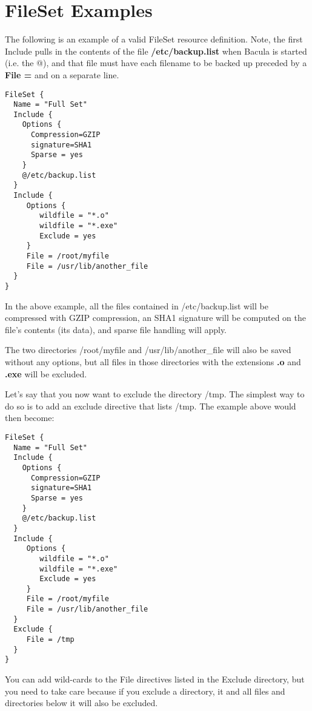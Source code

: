 \section{FileSet Examples}

The following is an example of a valid FileSet resource definition.  Note,
the first Include pulls in the contents of the file {\bf /etc/backup.list}
when Bacula is started (i.e.  the @), and that file must have each filename
to be backed up preceded by a {\bf File =} and on a separate line.

\footnotesize
\begin{verbatim}
FileSet {
  Name = "Full Set"
  Include {
    Options {
      Compression=GZIP
      signature=SHA1
      Sparse = yes
    }
    @/etc/backup.list
  }
  Include {
     Options {
        wildfile = "*.o"
        wildfile = "*.exe"
        Exclude = yes
     }
     File = /root/myfile
     File = /usr/lib/another_file
  }
}
\end{verbatim}
\normalsize

In the above example, all the files contained in /etc/backup.list will
be compressed with GZIP compression, an SHA1 signature will be computed on the
file's contents (its data), and sparse file handling will apply. 

The two directories /root/myfile and /usr/lib/another\_file will also be saved
without any options, but all files in those directories with the extensions
{\bf .o} and {\bf .exe} will be excluded. 

Let's say that you now want to exclude the directory /tmp. The simplest way
to do so is to add an exclude directive that lists /tmp.  The example
above would then become:

\footnotesize 
\begin{verbatim}
FileSet {
  Name = "Full Set"
  Include {
    Options {
      Compression=GZIP
      signature=SHA1
      Sparse = yes
    }
    @/etc/backup.list
  }
  Include {
     Options {
        wildfile = "*.o"
        wildfile = "*.exe"
        Exclude = yes
     }
     File = /root/myfile
     File = /usr/lib/another_file
  }
  Exclude {
     File = /tmp
  }
}
\end{verbatim}
\normalsize


You can add wild-cards to the File directives listed in the Exclude
directory, but you need to take care because if you exclude a directory,
it and all files and directories below it will also be excluded.

